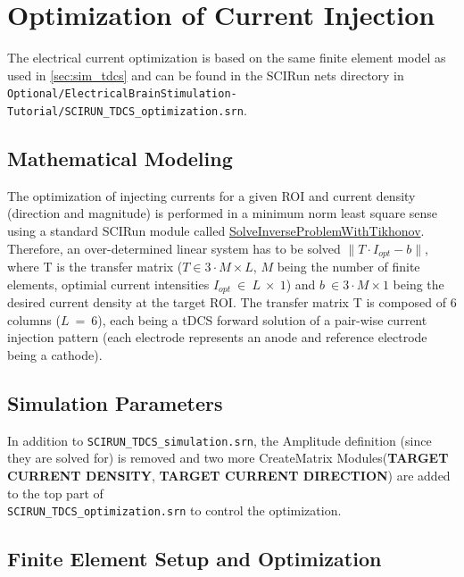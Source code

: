 \documentclass[fleqn,11pt,openany]{book}
\begin{document}
\section{Optimization of Current Injection}

The electrical current optimization is based on the same finite element model as used in \autoref{sec:sim_tdcs} and can be found in the SCIRun nets directory in \\
\texttt{Optional/ElectricalBrainStimulation-Tutorial/SCIRUN\_TDCS\_optimization.srn}.

\subsection{Mathematical Modeling}

The optimization of injecting currents for a given ROI and current density (direction and magnitude) is performed in a minimum norm least square sense using a standard
SCIRun module called
\href{http://scirundocwiki.sci.utah.edu/SCIRunDocs/index.php5/CIBC:Documentation:SCIRun:Reference:BioPSE:SolveInverseProblemWithTikhonov}{SolveInverseProblemWithTikhonov}.
Therefore, an over-determined linear system has to be solved $\|  T \cdot I_{opt} - b \|$, where T is the transfer matrix ($T \in 3 \cdot M \times L$, $M$ being the number of finite elements, optimial current intensities $I_{opt}\ \in\ L\ \times\ 1$) and $b\ \in 3 \cdot M \times 1$ being the desired current density at the target ROI.
The transfer matrix T is composed of 6 columns ($L\ =\ 6$), each being a tDCS forward solution of a pair-wise current injection pattern (each electrode represents an anode and reference electrode being a cathode).

\subsection{Simulation Parameters}

In addition to \texttt{SCIRUN\_TDCS\_simulation.srn}, the Amplitude definition (since they are solved for) is removed and two more CreateMatrix Modules(\textbf{TARGET CURRENT DENSITY}, \textbf{TARGET CURRENT DIRECTION}) are added to the top part of \\
\texttt{SCIRUN\_TDCS\_optimization.srn} to control the optimization.

\subsection{Finite Element Setup and Optimization}
\end{document}

